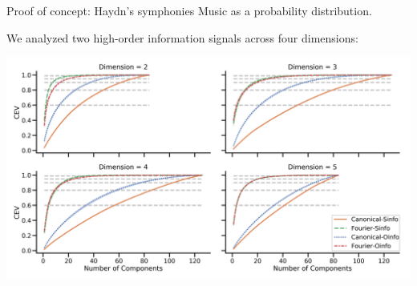 \begin{frame}{Proof of concept: Haydn's symphonies}
	\pause\vskip -5pt
	Music as a probability distribution.

	\pause\vskip 5pt
	We analyzed two high-order information signals across four dimensions:%

	\pause\vskip 7pt
	\hspace*{-15pt}
	\includegraphics[scale=.096]{aux/hyperharmonic}
\end{frame}
